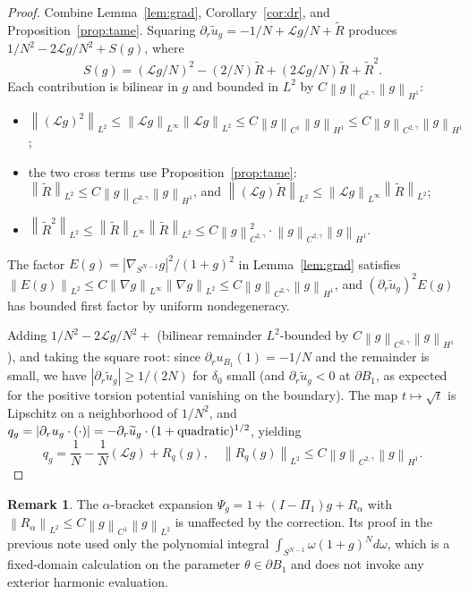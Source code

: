 \documentclass[11pt]{article}
\theoremstyle{definition}
\newtheorem{remark}[theorem]{Remark}
\newcommand{\norm}[1]{\left\|#1\right\|}
\newcommand{\abs}[1]{\left|#1\right|}
\begin{document}
\begin{proof}
Combine Lemma~\ref{lem:grad}, Corollary~\ref{cor:dr}, and
Proposition~\ref{prop:tame}. Squaring
$\partial_r\widetilde u_g=-1/N+\mathcal L g/N+\widetilde R$ produces
$1/N^2-2\mathcal L g/N^2+S(g)$, where
\[
S(g)=(\mathcal L g/N)^2-(2/N)\widetilde R+(2\mathcal L g/N)\widetilde R+\widetilde R^2.
\]
Each contribution is bilinear in $g$ and bounded in $L^2$ by
$C\norm{g}_{C^{2,\gamma}}\norm{g}_{H^1}$:
\begin{itemize}
\item $\norm{(\mathcal L g)^2}_{L^2}\le\norm{\mathcal L g}_{L^\infty}\norm{\mathcal L g}_{L^2}
\le C\norm{g}_{C^1}\norm{g}_{H^1}\le C\norm{g}_{C^{2,\gamma}}\norm{g}_{H^1}$;
\item the two cross terms use Proposition~\ref{prop:tame}:
$\norm{\widetilde R}_{L^2}\le C\norm{g}_{C^{2,\gamma}}\norm{g}_{H^1}$, and
$\norm{(\mathcal L g)\widetilde R}_{L^2}\le\norm{\mathcal L g}_{L^\infty}\norm{\widetilde R}_{L^2}$;
\item $\norm{\widetilde R^2}_{L^2}\le\norm{\widetilde R}_{L^\infty}\norm{\widetilde R}_{L^2}\le C\norm{g}_{C^{2,\gamma}}^2
\cdot\norm{g}_{C^{2,\gamma}}\norm{g}_{H^1}$.
\end{itemize}

The factor
$E(g)=\abs{\nabla_{S^{N-1}}g}^2/(1+g)^2$ in Lemma~\ref{lem:grad} satisfies
$\norm{E(g)}_{L^2}\le C\norm{\nabla g}_{L^\infty}\norm{\nabla g}_{L^2}\le
C\norm{g}_{C^{2,\gamma}}\norm{g}_{H^1}$, and
$(\partial_r\widetilde u_g)^2E(g)$ has bounded first factor by uniform
nondegeneracy.

Adding $1/N^2-2\mathcal L g/N^2+$ (bilinear remainder $L^2$-bounded by
$C\norm{g}_{C^{2,\gamma}}\norm{g}_{H^1}$), and taking the square root: since
$\partial_r u_{B_1}(1)=-1/N$ and the remainder is small, we have
$\abs{\partial_r\widetilde u_g}\ge1/(2N)$ for $\delta_0$ small (and
$\partial_r\widetilde u_g<0$ at $\partial B_1$, as expected for the
positive torsion potential vanishing on the boundary). The map
$t\mapsto\sqrt t$ is Lipschitz on a neighborhood of $1/N^2$, and
$q_g=\abs{\partial_r u_g\cdot(\cdot)}=-\partial_r\widetilde u_g\cdot
(1+\hbox{quadratic})^{1/2}$, yielding
\[
q_g=\frac{1}{N}-\frac{1}{N}(\mathcal L g)+R_q(g),
\quad
\norm{R_q(g)}_{L^2}\le C\norm{g}_{C^{2,\gamma}}\norm{g}_{H^1}.
\]
\end{proof}

\begin{remark}
The $\alpha$-bracket expansion $\Psi_g=1+(I-\Pi_1)g+R_\alpha$ with
$\norm{R_\alpha}_{L^2}\le C\norm{g}_{C^1}\norm{g}_{L^2}$ is unaffected by the
correction. Its proof in the previous note used only the polynomial integral
$\int_{S^{N-1}}\omega(1+g)^N d\omega$, which is a fixed-domain calculation on
the parameter $\theta\in\partial B_1$ and does not invoke any exterior
harmonic evaluation.
\end{remark}
\end{document}
